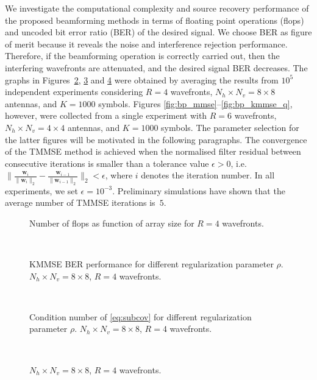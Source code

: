\documentclass{cta-author}
\begin{document}
We investigate the computational complexity and source recovery performance of the proposed beamforming methods in terms of floating point operations (flops) and uncoded bit error ratio (BER) of the desired signal. We choose BER as figure of merit because it reveals the noise and interference rejection performance. Therefore, if the beamforming operation is correctly carried out, then the interfering wavefronts are attenuated, and the desired signal BER decreases. The graphs in Figures~\ref{fig:ber_lambda}, \ref{fig:cond_lambda} and \ref{fig:ber_random} were obtained by averaging the results from $10^5$ independent experiments considering $R=4$ wavefronts, $N_h \times N_v = 8 \times 8$ antennas, and $K=1000$ symbols. Figures \ref{fig:bp_mmse}--\ref{fig:bp_kmmse_q}, however, were collected from a single experiment with $R=6$ wavefronts, $N_h \times N_v = 4 \times 4$ antennas, and $K=1000$ symbols. The parameter selection for the latter figures will be motivated in the following paragraphs. The convergence of the TMMSE method is achieved when the normalised filter residual between consecutive iterations is smaller than a tolerance value $\epsilon >0$, i.e. $\|\frac{\bm{w}_i}{\|\bm{w}_i\|_2} - \frac{\bm{w}_{i-1}}{\|\bm{w}_{i-1}\|_2}\|_2 < \epsilon$, where $i$ denotes the iteration number. In all experiments, we set $\epsilon=10^{-3}$. Preliminary simulations have shown that the average number of TMMSE iterations is~$5$.

\begin{figure}[tb]
	\centering
	
	\caption{Number of flops as function of array size for $R=4$ wavefronts.}	
	\label{fig:flops}
\end{figure}
~
\begin{figure}[tb]
	\centering
	
	\caption{KMMSE BER performance for different regularization parameter $\rho$. $N_h \times N_v = 8 \times 8$, $R=4$ wavefronts.}
	\label{fig:ber_lambda}	
\end{figure}
~
\begin{figure}[tb]
	\centering
	
	\caption{Condition number of \eqref{eq:subcov} for different regularization parameter $\rho$. $N_h \times N_v = 8 \times 8$, $R=4$ wavefronts.}
	\label{fig:cond_lambda}
\end{figure}
~
\begin{figure}[tb]
	\centering
	
	\caption{$N_h \times N_v = 8 \times 8$, $R=4$ wavefronts.}
	\label{fig:ber_random}	
\end{figure}
\end{document}
